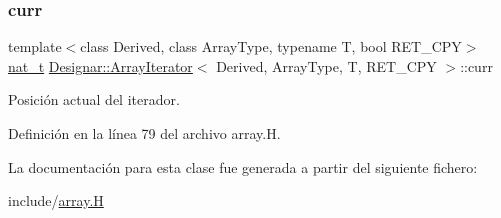 \subsubsection{\texorpdfstring{curr}{curr}}
{\footnotesize\ttfamily template$<$class Derived, class Array\+Type, typename T, bool R\+E\+T\+\_\+\+C\+PY$>$ \\
\hyperlink{namespace_designar_aa72662848b9f4815e7bf31a7cf3e33d1}{nat\+\_\+t} \hyperlink{class_designar_1_1_array_iterator}{Designar\+::\+Array\+Iterator}$<$ Derived, Array\+Type, T, R\+E\+T\+\_\+\+C\+PY $>$\+::curr\hspace{0.3cm}{\ttfamily [protected]}}



Posición actual del iterador. 



Definición en la línea 79 del archivo array.\+H.



La documentación para esta clase fue generada a partir del siguiente fichero\+:\begin{DoxyCompactItemize}
\item 
include/\hyperlink{array_8_h}{array.\+H}\end{DoxyCompactItemize}
